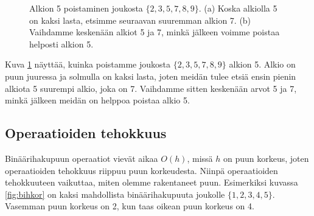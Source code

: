 \begin{figure}
\center
{}
\caption{Alkion 5 poistaminen joukosta $\{2,3,5,7,8,9\}$. (a) Koska alkiolla
5 on kaksi lasta, etsimme seuraavan suuremman alkion 7.
(b) Vaihdamme keskenään alkiot 5 ja 7, minkä jälkeen voimme poistaa helposti alkion 5.}
\label{fig:bihpu3}
\end{figure}

Kuva \ref{fig:bihpu3} näyttää, kuinka poistamme joukosta $\{2,3,5,7,8,9\}$ alkion 5.
Alkio on puun juuressa ja solmulla on kaksi lasta,
joten meidän tulee etsiä ensin pienin alkiota 5 suurempi alkio,
joka on 7.
Vaihdamme sitten keskenään arvot 5 ja 7,
minkä jälkeen meidän on helppoa poistaa alkio 5.

\subsection{Operaatioiden tehokkuus}

Binäärihakupuun operaatiot vievät aikaa $O(h)$,
missä $h$ on puun korkeus, joten operaatioiden tehokkuus
riippuu puun korkeudesta.
Niinpä operaatioiden tehokkuuteen vaikuttaa, miten olemme
rakentaneet puun.
Esimerkiksi kuvassa \ref{fig:bihkor} on kaksi mahdollista
binäärihakupuuta joukolle $\{1,2,3,4,5\}$.
Vasemman puun korkeus on 2, kun taas oikean puun korkeus on 4.

